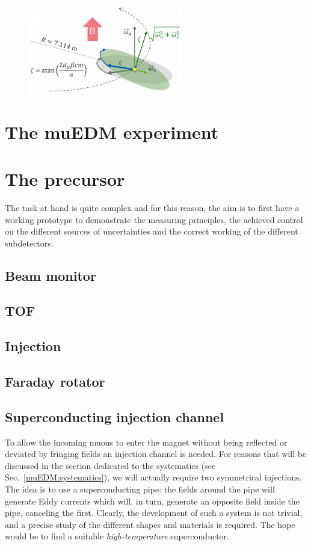\begin{refsection}
        \begin{figure}
            \centering
            \includegraphics[width = 0.6\textwidth]{Figures/muEDM/g-2_EDM.png}
            \caption{}
            \label{fig:muEDM:g-2_EDM}
        \end{figure}
        
\section{The muEDM experiment}

\section{The precursor}
    The task at hand is quite complex and for this reason, the aim is to first have a working prototype to demonstrate the measuring principles, the achieved control on the different sources of uncertainties and the correct working of the different subdetectors.

    \subsection{Beam monitor}
    \subsection{TOF}
    \subsection{Injection}
    \subsection{Faraday rotator}
    
    \subsection{Superconducting injection channel}
        To allow the incoming muons to enter the magnet without being reflected or deviated by fringing fields an injection channel is needed.
        For reasons that will be discussed in the section dedicated to the systematics (see Sec.~\ref{muEDM:systematics}), we will actually require two symmetrical injections.
        The idea is to use a superconducting pipe: the fields around the pipe will generate Eddy currents which will, in turn, generate an opposite field inside the pipe, canceling the first.
        Clearly, the development of such a system is not trivial, and a precise study of the different shapes and materials is required. 
        The hope would be to find a suitable \textit{high-temperature} superconductor.


\end{refsection}

